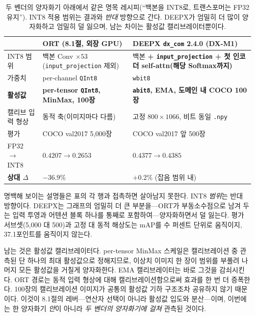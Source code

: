 \documentclass[11pt]{article}
\begin{document}
\begin{table}[htbp]
\centering
\small
\begin{tabular}{L{3.0cm} L{4.6cm} L{5.4cm}}
\toprule
 & \textbf{ORT (8.1절, 외장 GPU)} & \textbf{DEEPX \texttt{dx\_com} 2.4.0 (DX-M1)} \\
\midrule
INT8 범위          & 백본 Conv $\times 53$ (\texttt{input\_projection} 제외) & 백본 \textbf{+ \texttt{input\_projection} + 첫 인코더 self-attn(해당 Softmax까지)} \\
가중치             & per-channel \texttt{QInt8} & \texttt{wbit8} \\
\textbf{활성값}    & \textbf{per-tensor \texttt{QInt8}, MinMax, 100장} & \textbf{\texttt{abit8}, EMA, 도메인 내 COCO 100장} \\
캘리브 입력 형상   & 동적 축(이미지마다 다름) & 고정 $800\times1066$, 비트 동일 \texttt{.npy} \\
평가               & COCO val2017 5{,}000장 & COCO val2017 앞 500장 \\
FP32 $\rightarrow$ INT8 & $0.4207 \rightarrow 0.2653$ & $0.4377 \rightarrow 0.4385$ \\
\textbf{상대 $\Delta$} & $\mathbf{-36.9}$\% & $\mathbf{+0.2}$\% (잡음 범위 내) \\
\bottomrule
\end{tabular}
\caption{두 벤더의 양자화기 아래에서 같은 명목 레시피(``백본을 INT8로, 트랜스포머는 FP32 유지''). INT8 적용 범위는 결과와 \emph{반대} 방향으로 간다. DEEPX가 엄밀히 더 많이 양자화하고 엄밀히 덜 잃으며, 남는 차이는 활성값 캘리브레이터뿐이다.}
\label{tab:quantizer}
\end{table}

명백해 보이는 설명들은 표의 각 행과 접촉하면 살아남지 못한다. INT8 \emph{범위}는 반대 방향이다. DEEPX는 그래프의 엄밀히 더 큰 부분을---ORT가 부동소수점으로 남겨 두는 입력 투영과 어텐션 블록 하나를 통째로 포함하여---양자화하면서 덜 잃는다. 평가 서브셋(5{,}000 대 500)과 고정 대 동적 해상도는 mAP를 수 퍼센트 단위로 움직이지, 37.1포인트를 움직이지 않는다.

남는 것은 활성값 캘리브레이터다. per-tensor MinMax 스케일은 캘리브레이션 중 관측된 단 하나의 최대 활성값으로 정해지므로, 이상치 이미지 한 장이 범위를 부풀려 나머지 모든 활성값을 거칠게 양자화한다. EMA 캘리브레이터는 바로 그것을 감쇠시킨다. ORT 경로는 동적 입력 형상에 대해 캘리브레이션함으로써 효과를 한 번 더 증폭한다. 100장의 캘리브레이션 이미지가 공통의 활성값 기하 구조조차 공유하지 않기 때문이다. 이것이 8.1절의 레버---연산자 선택이 아니라 활성값 입도와 분산---이며, 이번에는 한 양자화기 \emph{안}이 아니라 \emph{두 벤더의 양자화기에 걸쳐} 관측된 것이다.
\end{document}
